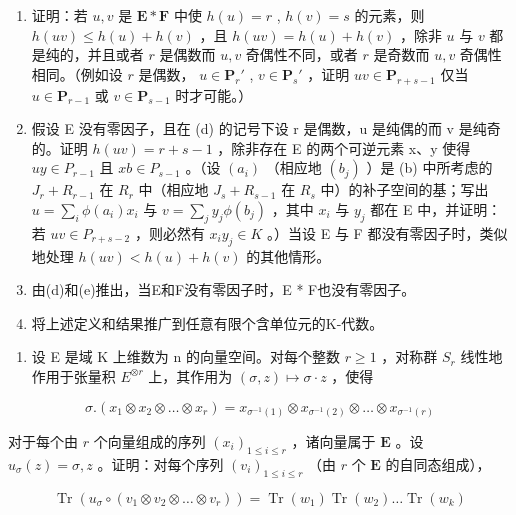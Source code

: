 \begin{enumerate}
\def\labelenumi{(\alph{enumi})}
\setcounter{enumi}{3}
\item
  证明：若 \(u, v\) 是 \(\mathbf{E} * \mathbf{F}\) 中使 \(h(u) = r\) , \(h(v) = s\) 的元素，则 \(h(uv) \leqslant h(u) + h(v)\) ，且 \(h(uv) = h(u) + h(v)\) ，除非 \(u\) 与 \(v\) 都是纯的，并且或者 \(r\) 是偶数而 \(u, v\) 奇偶性不同，或者 \(r\) 是奇数而 \(u, v\) 奇偶性相同。（例如设 \(r\) 是偶数， \(u \in \mathbf{P}_r'\) , \(v \in \mathbf{P}_s'\) ，证明 \(uv \in \mathbf{P}_{r+s-1}\) 仅当 \(u \in \mathbf{P}_{r-1}\) 或 \(v \in \mathbf{P}_{s-1}\) 时才可能。）
\item
  假设 E 没有零因子，且在 (d) 的记号下设 r 是偶数，u 是纯偶的而 v 是纯奇的。证明 \(h(uv) = r + s - 1\) ，除非存在 E 的两个可逆元素 x、y 使得 \(uy \in P_{r-1}\) 且 \(xb \in P_{s-1}\) 。（设 \((a_i)\) （相应地 \((b_j)\) ）是 (b) 中所考虑的 \(J_r + R_{r-1}\) 在 \(R_r\) 中（相应地 \(J_s + R_{s-1}\) 在 \(R_s\) 中）的补子空间的基；写出 \(u = \sum_i \phi(a_i)x_i\) 与 \(v = \sum_j y_j \phi(b_j)\) ，其中 \(x_i\) 与 \(y_j\) 都在 E 中，并证明：若 \(uv \in P_{r+s-2}\) ，则必然有 \(x_i y_j \in K\) 。）当设 E 与 F 都没有零因子时，类似地处理 \(h(uv) < h(u) + h(v)\) 的其他情形。
\item
  由(d)和(e)推出，当E和F没有零因子时，E * F也没有零因子。
\item
  将上述定义和结果推广到任意有限个含单位元的K-代数。
\end{enumerate}

\begin{enumerate}
\def\labelenumi{\arabic{enumi}.}
\setcounter{enumi}{6}
\tightlist
\item
  设 E 是域 K 上维数为 n 的向量空间。对每个整数 \(r \geqslant 1\) ，对称群 \(S_{r}\) 线性地作用于张量积 \(E^{\otimes r}\) 上，其作用为 \((\sigma, z) \mapsto \sigma \cdot z\) ，使得
\end{enumerate}

\[
\sigma . \left(x _ {1} \otimes x _ {2} \otimes \dots \otimes x _ {r}\right) = x _ {\sigma^ {- 1} (1)} \otimes x _ {\sigma^ {- 1} (2)} \otimes \dots \otimes x _ {\sigma^ {- 1} (r)}
\]

对于每个由 \(r\) 个向量组成的序列 \((x_i)_{1 \leqslant i \leqslant r}\) ，诸向量属于 \(\mathbf{E}\) 。设 \(u_{\sigma}(z) = \sigma, z\) 。证明：对每个序列 \((v_i)_{1 \leqslant i \leqslant r}\) （由 \(r\) 个 \(\mathbf{E}\) 的自同态组成），

\[
\operatorname{Tr} (u _ {\sigma} \circ (v _ {1} \otimes v _ {2} \otimes \dots \otimes v _ {r})) = \operatorname{Tr} (w _ {1}) \operatorname{Tr} (w _ {2}) \dots \operatorname{Tr} (w _ {k})\tag{*}
\]

